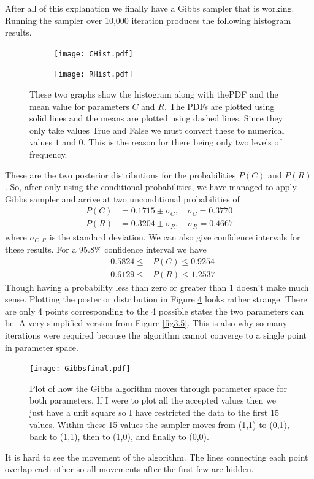 \documentclass[12pt,twoside]{report}   %
\begin{document}
After all of this explanation we finally have a Gibbs sampler that is working. Running the sampler over 10,000 iteration produces the following histogram results.
\begin{figure}[H] 
  \begin{subfigure}[b]{0.5\linewidth}
    \centering
    \hspace{-13pt}
    \texttt{[image: CHist.pdf]}
    \label{fig3.3:a}
  \end{subfigure}
  \begin{subfigure}[b]{0.5\linewidth}
    \centering
    \hspace{-13pt}
    \texttt{[image: RHist.pdf]}
    \label{fig3.3:b}
  \end{subfigure}\hfill%
  \caption{These two graphs show the histogram along with thePDF and the mean value for parameters $C$ and $R$. The PDFs are plotted using solid lines and the means are plotted using dashed lines. Since they only take values True and False we must convert these to numerical values $1$ and $0$. This is the reason for there being only two levels of frequency.}
  \label{fig3.3} 
\end{figure}
These are the two posterior distributions for the probabilities $P(C)$ and $P(R)$. So, after only using the conditional probabilities, we have managed to apply Gibbs sampler and arrive at two unconditional probabilities of
\begin{align*}
P(C) &= 0.1715 \pm \sigma_C,\quad\sigma_C = 0.3770\\
P(R) &= 0.3204 \pm \sigma_R,\quad\sigma_R = 0.4667
\end{align*}
where $\sigma_{C,R}$ is the standard deviation. We can also give confidence intervals for these results. For a 95.8\% confidence interval we have
\begin{align*}
-0.5824 \leq &P(C) \leq 0.9254\\
-0.6129 \leq &P(R) \leq 1.2537
\end{align*}
Though having a probability less than zero or greater than 1 doesn't make much sense. Plotting the posterior distribution in Figure \ref{fig3.4} looks rather strange. There are only 4 points corresponding to the 4 possible states the two parameters can be. A very simplified version from Figure \ref{fig3.5}. This is also why so many iterations were required because the algorithm cannot converge to a single point in parameter space. 
\begin{figure}[H]
\centering
\texttt{[image: Gibbsfinal.pdf]}
\caption{Plot of how the Gibbs algorithm moves through parameter space for both parameters. If I were to plot all the accepted values then we just have a unit square so I have restricted the data to the first 15 values. Within these 15 values the sampler moves from (1,1) to (0,1), back to (1,1), then to (1,0), and finally to (0,0).}
\label{fig3.4}
\end{figure}
It is hard to see the movement of the algorithm. The lines connecting each point overlap each other so all movements after the first few are hidden. 
\end{document}
